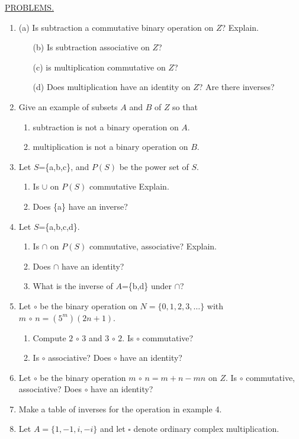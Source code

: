 \documentclass[12pt]{article}
\theoremstyle{definition}
\begin{document}
\underline{PROBLEMS.}
\begin{enumerate}
\item (a) Is subtraction a commutative binary operation on $Z$?  Explain.
\begin{enumerate}
\item[(b)] Is subtraction associative on $Z$?
\item[(c)]  is multiplication commutative on $Z$?
\item[(d)]  Does multiplication have an identity on $Z$?  Are there inverses?
\end{enumerate}
\item Give an example of subsets $A$ and $B$ of $Z$ so that
\begin{enumerate}
\item subtraction is not a binary operation on $A$.
\item multiplication is not a binary operation on $B$.
\end{enumerate}
\item Let $S$=\{a,b,c\}, and $P(S)$ be the power set of $S$.
\begin{enumerate}
\item Is $\cup$ on $P(S)$ commutative  Explain.
\item Does \{a\} have an inverse?
\end{enumerate}
\item Let $S$=\{a,b,c,d\}.
\begin{enumerate}
\item Is $\cap$ on $P(S)$ commutative, associative?  Explain.
\item Does $\cap$ have an identity?
\item What is the inverse of $A$=\{b,d\} under $\cap$?
\end{enumerate}
\item Let $\circ$ be the binary operation on $N=\{0,1,2,3,\dots\}$ with $m\,\circ\,n = (5^m)(2n+1)$.
\begin{enumerate}
\item Compute $2\,\circ\, 3$ and $ 3\,\circ\,2$.  Is $\circ$ commutative?
\item Is $\circ$ associative?  Does $\circ$ have an identity?
\end{enumerate}
\item Let $\circ$ be the binary operation $m\,\circ\,n=m+n-mn$ on $Z$.  Is $\circ$ commutative, associative?  Does $\circ$ have an identity?
\item Make a table of inverses for the operation in example 4.
\item Let $A=\{1,-1,i,-i\}$ and let $\square$ denote ordinary complex multiplication.\\

\end{enumerate}
\end{document}
